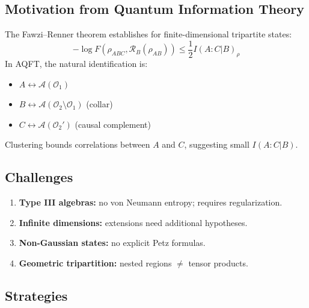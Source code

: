 \documentclass[11pt,a4paper]{article}
\theoremstyle{plain}
\theoremstyle{definition}
\theoremstyle{remark}
\newcommand{\Aa}{\mathcal{A}}
\newcommand{\Oo}{\mathcal{O}}
\begin{document}
\subsection{Motivation from Quantum Information Theory}

The Fawzi--Renner theorem \cite{FawziRenner15} establishes for finite-dimensional
tripartite states:
\begin{equation}
-\log F(\rho_{ABC}, \mathcal{R}_B(\rho_{AB})) \le \frac{1}{2} I(A : C | B)_\rho
\end{equation}
In AQFT, the natural identification is:
\begin{itemize}
\item $A \leftrightarrow \Aa(\Oo_1)$
\item $B \leftrightarrow \Aa(\Oo_2 \setminus \Oo_1)$ (collar)
\item $C \leftrightarrow \Aa(\Oo_2')$ (causal complement)
\end{itemize}
Clustering bounds correlations between $A$ and $C$, suggesting small
$I(A : C | B)$.

\subsection{Challenges}

\begin{enumerate}
\item \textbf{Type III algebras:} no von Neumann entropy; requires regularization.
\item \textbf{Infinite dimensions:} extensions \cite{JRSWW18} need additional
hypotheses.
\item \textbf{Non-Gaussian states:} no explicit Petz formulas.
\item \textbf{Geometric tripartition:} nested regions $\neq$ tensor products.
\end{enumerate}

\subsection{Strategies}\label{sec:strategies}
\end{document}
